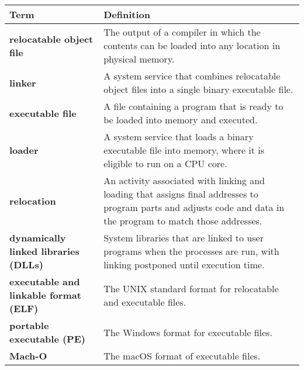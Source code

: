 \begin{tabular}{>{\raggedright}p{} >{\raggedright\arraybackslash}p{}}
\toprule
\textbf{Term} & \textbf{Definition} \\
\midrule
\textbf{relocatable object file} & The output of a compiler in which the contents can be loaded into any location in physical memory. \\
\textbf{linker} & A system service that combines relocatable object files into a single binary executable file. \\
\textbf{executable file} & A file containing a program that is ready to be loaded into memory and executed. \\
\textbf{loader} & A system service that loads a binary executable file into memory, where it is eligible to run on a CPU core. \\
\textbf{relocation} & An activity associated with linking and loading that assigns final addresses to program parts and adjusts code and data in the program to match those addresses. \\
\textbf{dynamically linked libraries (DLLs)} & System libraries that are linked to user programs when the processes are run, with linking postponed until execution time. \\
\textbf{executable and linkable format (ELF)} & The UNIX standard format for relocatable and executable files. \\
\textbf{portable executable (PE)} & The Windows format for executable files. \\
\textbf{Mach-O} & The macOS format of executable files. \\
\bottomrule
\end{tabular}
\vspace{\baselineskip}
